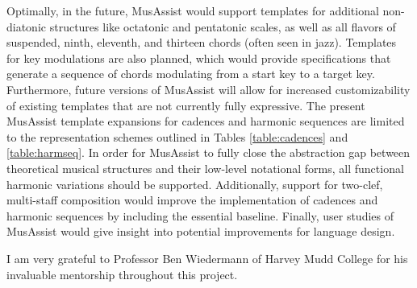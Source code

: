 \documentclass{article}
\begin{document}
Optimally, in the future, MusAssist would support templates for additional non-diatonic structures like octatonic and pentatonic scales, as well as all flavors of suspended, ninth, eleventh, and thirteen chords (often seen in jazz). Templates for key modulations are also planned, which would provide specifications that generate a sequence of chords modulating from a start key to a target key. Furthermore, future versions of MusAssist will allow for increased customizability of existing templates that are not currently fully expressive. The present MusAssist template expansions for cadences and harmonic sequences are limited to the representation schemes outlined in Tables \ref{table:cadences} and \ref{table:harmseq}. In order for MusAssist to fully close the abstraction gap between theoretical musical structures and their low-level notational forms, all functional harmonic variations should be supported. Additionally, support for two-clef, multi-staff composition would improve the implementation of cadences and harmonic sequences by including the essential baseline. Finally, user studies of MusAssist would give insight into potential improvements for language design.

\begin{acknowledgments}
I am very grateful to Professor Ben Wiedermann of Harvey Mudd College for his invaluable mentorship throughout this project.
\end{acknowledgments} 


\end{document}
